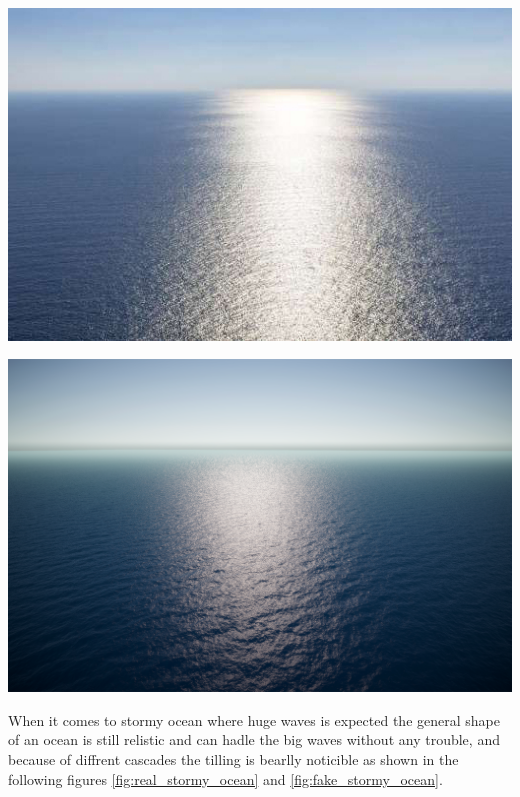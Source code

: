 \begin{minipage}{0.48\textwidth}
    \centering
    \includegraphics[width=1\textwidth]{"images/real_calm_ocean.jpg"}
    \captionsetup{justification=centering}
    \label{fig:real_calm_ocean}
\end{minipage}
\hfill
\begin{minipage}{0.48\textwidth}
    \centering
    \includegraphics[width=1\textwidth]{"images/fake_calm_ocean.png"}
    \label{fig:fake_calm_ocean}
\end{minipage}

When it comes to stormy ocean where huge waves is expected the general shape of an ocean is still relistic
and can hadle the big waves without any trouble, and because of diffrent cascades the tilling is bearlly noticible as shown in the following figures \ref{fig:real_stormy_ocean} and \ref{fig:fake_stormy_ocean}.

